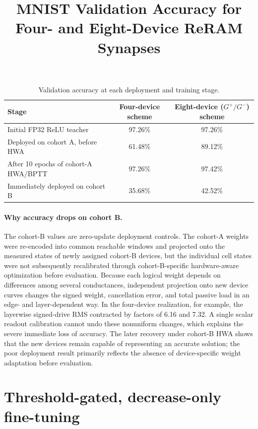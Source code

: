 \documentclass{article}
\title{MNIST Validation Accuracy for Four- and Eight-Device ReRAM Synapses}
\author{}
\date{}
\begin{document}
\maketitle

\begin{table}[ht]
  \centering
  \caption{Validation accuracy at each deployment and training stage.}
  \label{tab:four-vs-eight-device-validation-accuracy}
  \begin{tabularx}{\textwidth}{@{}Xcc@{}}
    \toprule
    Stage & Four-device scheme & Eight-device ($G^+/G^-$) scheme \\
    \midrule
    Initial FP32 ReLU teacher
      & 97.26\% & 97.26\% \\
    Deployed on cohort A, before HWA
      & 61.48\% & 89.12\% \\
    After 10 epochs of cohort-A HWA/BPTT
      & 97.26\% & 97.42\% \\
    Immediately deployed on cohort B
      & 35.68\% & 42.52\% \\
    \bottomrule
  \end{tabularx}
\end{table}

\paragraph{Why accuracy drops on cohort B.}
The cohort-B values are zero-update deployment controls. The cohort-A weights
were re-encoded into common reachable windows and projected onto the measured
states of newly assigned cohort-B devices, but the individual cell states were
not subsequently recalibrated through cohort-B-specific hardware-aware
optimization before evaluation. Because each logical weight depends on
differences among several conductances, independent projection onto new device
curves changes the signed weight, cancellation error, and total passive load in
an edge- and layer-dependent way. In the four-device realization, for example,
the layerwise signed-drive RMS contracted by factors of 6.16 and 7.32. A single
scalar readout calibration cannot undo these nonuniform changes, which explains
the severe immediate loss of accuracy. The later recovery under cohort-B HWA
shows that the new devices remain capable of representing an accurate solution;
the poor deployment result primarily reflects the absence of device-specific
weight adaptation before evaluation.

\section*{Threshold-gated, decrease-only fine-tuning}
\end{document}
